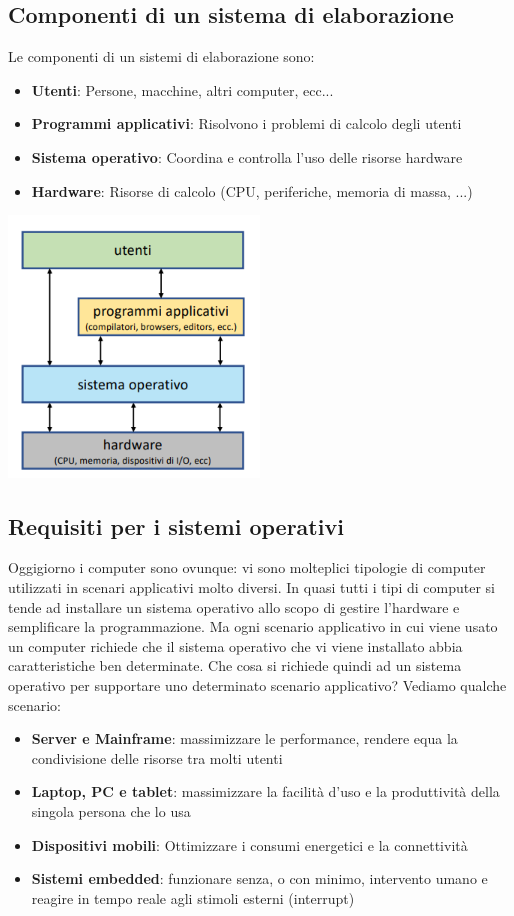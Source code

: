 \documentclass[12pt]{article}
\begin{document}
\subsection{Componenti di un sistema di elaborazione}
Le componenti di un sistemi di elaborazione sono:
\begin{itemize}
    \item \textbf{Utenti}: Persone, macchine, altri computer, ecc...
    \item \textbf{Programmi applicativi}: Risolvono i problemi di calcolo degli utenti
    \item \textbf{Sistema operativo}: Coordina e controlla l'uso delle risorse hardware
    \item \textbf{Hardware}: Risorse di calcolo (CPU, periferiche, memoria di massa, ...)
\end{itemize}
\begin{center}
    \includegraphics[width = 0.50\textwidth]{Images/1.PNG}
\end{center}
\subsection{Requisiti per i sistemi operativi}
Oggigiorno i computer sono ovunque: vi sono molteplici tipologie di computer utilizzati in scenari
applicativi molto diversi. In quasi tutti i tipi di computer si tende ad installare un sistema operativo allo scopo
di gestire l'hardware e semplificare la programmazione. Ma ogni scenario applicativo in cui viene usato un computer
richiede che il sistema operativo che vi viene installato abbia caratteristiche ben determinate. Che cosa si richiede quindi
ad un sistema operativo per supportare uno determinato scenario applicativo?
Vediamo qualche scenario:
\begin{itemize}
    \item \textbf{Server e Mainframe}: massimizzare le performance, rendere equa la condivisione delle risorse tra molti utenti
    \item \textbf{Laptop, PC e tablet}: massimizzare la facilità d'uso e la produttività della singola persona che lo usa
    \item \textbf{Dispositivi mobili}: Ottimizzare i consumi energetici e la connettività
    \item \textbf{Sistemi embedded}: funzionare senza, o con minimo, intervento umano e reagire in tempo reale agli stimoli esterni (interrupt)
\end{itemize}
\end{document}
